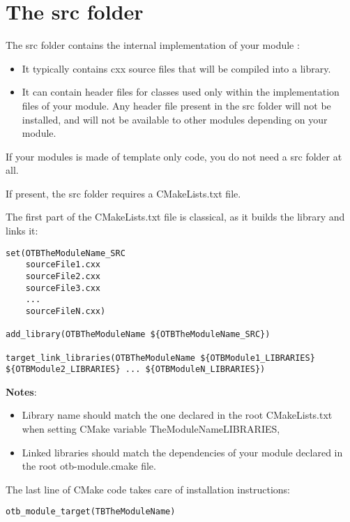 \section{The src folder }

The src folder contains the internal implementation of your module :

\begin{itemize}
       \item  It typically contains cxx source files that will be compiled into a library.
       \item  It can contain header files for classes used only within the implementation files of your module. Any header file present in the src folder will not be installed, and will not be available to other modules depending on your module.
\end{itemize}

If your modules is made of template only code, you do not need a src folder at all.

If present, the src folder requires a CMakeLists.txt file.

The first part of the CMakeLists.txt file is classical, as it builds the library and links it:

\begin{verbatim}
set(OTBTheModuleName_SRC
    sourceFile1.cxx
    sourceFile2.cxx
    sourceFile3.cxx
    ...
    sourceFileN.cxx)

add_library(OTBTheModuleName ${OTBTheModuleName_SRC})

target_link_libraries(OTBTheModuleName ${OTBModule1_LIBRARIES} ${OTBModule2_LIBRARIES} ... ${OTBModuleN_LIBRARIES})
\end{verbatim}

\textbf{Notes}:

\begin{itemize}
       \item  Library name should match the one declared in the root CMakeLists.txt when setting CMake variable TheModuleName\textunderscore LIBRARIES,
       \item  Linked libraries should match the dependencies of your module declared in the root otb-module.cmake file.
\end{itemize}

The last line of CMake code takes care of installation instructions:
\begin{verbatim}
otb_module_target(TBTheModuleName)
\end{verbatim}


